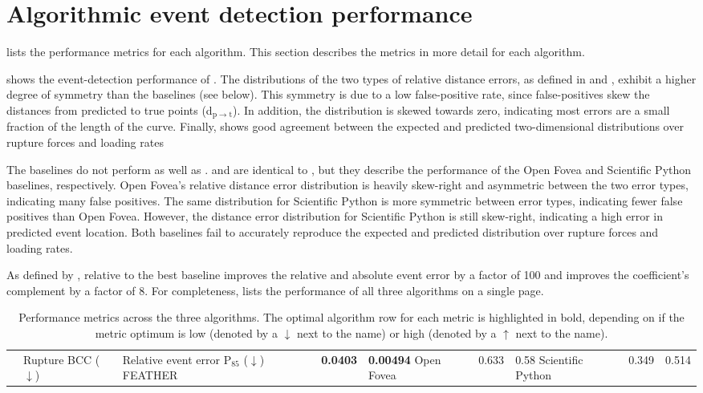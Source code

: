 \section{Algorithmic event detection performance}

 lists the performance metrics for each algorithm. This section describes the metrics in more detail for each algorithm. 

 shows the event-detection performance of \name{}. The distributions of the two types of relative distance errors, as defined in  and , exhibit a higher degree of symmetry than the baselines (see below). This symmetry is due to a low false-positive rate, since false-positives skew the distances from predicted to true points (d$_{\mathrm{p}\rightarrow\mathrm{t}}$). In addition, the distribution is skewed towards zero, indicating most errors are a small fraction of the length of the curve. Finally,  shows good agreement between the expected and predicted two-dimensional distributions over rupture forces and loading rates 

The baselines do not perform as well as \name{}.  and  are identical to , but they describe the performance of the Open Fovea and Scientific Python baselines, respectively. Open Fovea's relative distance error distribution is heavily skew-right and asymmetric between the two error types, indicating many false positives. The same distribution for Scientific Python is more symmetric between error types, indicating fewer false positives than Open Fovea. However, the distance error distribution for Scientific Python is still skew-right, indicating a high error in predicted event location. Both baselines fail to accurately reproduce the expected and predicted distribution over rupture forces and loading rates.

As defined by , relative to the best baseline \name{} improves the relative and absolute event error by a factor of 100 and improves the \bc{} coefficient's complement by a factor of 8. For completeness,  lists the performance of all three algorithms on a single page.

\begin{table}
\caption[Algorithm performance]{ Performance metrics across the three algorithms. The optimal algorithm row for each metric is highlighted in bold, depending on if the metric optimum is low (denoted by a $\downarrow$ next to the name) or high (denoted by a $\uparrow$ next to the name).} 
\begin{tabularx}{\textwidth}{ l || l | l }
\hline \hline
 & Rupture BCC ($\downarrow$) & Relative event error P$_{85}$ ($\downarrow$)\e\hline 
FEATHER & \textbf{0.0403} & \textbf{0.00494}\e
Open Fovea & 0.633 & 0.58\e
Scientific Python & 0.349 & 0.514\e
\end{tabularx}
\end{table}



